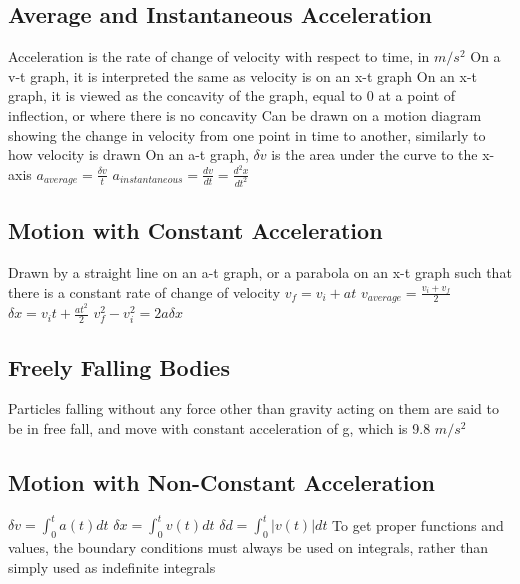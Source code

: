 \documentclass[11 pt, twoside]{article}
\newenvironment{outline*}
{
	\begin{outline}[enumerate]
	}
	{\end{outline}
}
\begin{document}
\subsection{Average and Instantaneous Acceleration}
\begin{outline*}
\1 Acceleration is the rate of change of velocity with respect to time, in $m/s^2$
\2 On a v-t graph, it is interpreted the same as velocity is on an x-t graph
\2 On an x-t graph, it is viewed as the concavity of the graph, equal to 0 at a point of inflection, or where there is no concavity
\2 Can be drawn on a motion diagram showing the change in velocity from one point in time to another, similarly to how velocity is drawn
\2 On an a-t graph, $\delta v$ is the area under the curve to the x-axis
\1 $a_{average} = \frac{\delta v}{t}$
\1 $a_{instantaneous} = \frac{dv}{dt} = \frac{d^2x}{dt^2}$
\end{outline*}
\subsection{Motion with Constant Acceleration}
\begin{outline*}
\1 Drawn by a straight line on an a-t graph, or a parabola on an x-t graph such that there is a constant rate of change of velocity
\1 $v_f = v_i + at$
\1 $v_{average} = \frac{v_i + v_f}{2}$
\1 $\delta x = v_it + \frac{at^2}{2}$
\1 $v_f^2 - v_i^2 = 2a\delta x$
\end{outline*}
\subsection{Freely Falling Bodies}
\begin{outline*}
\1 Particles falling without any force other than gravity acting on them are said to be in free fall, and move with constant acceleration of g, which is 9.8 $m/s^2$
\end{outline*}
\subsection{Motion with Non-Constant Acceleration}
\begin{outline*}
\1 $\delta v = \int_0^t a(t)dt$
\1 $\delta x = \int_0^t v(t)dt$
\1 $\delta d = \int_0^t |v(t)|dt$
\1 To get proper functions and values, the boundary conditions must always be used on integrals, rather than simply used as indefinite integrals
\end{outline*}
\end{document}
